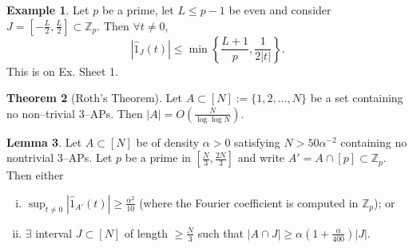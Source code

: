 \documentclass{article}
\theoremstyle{definition}
\newtheorem{theorem}{Theorem}[section]
\newtheorem{lemma}[theorem]{Lemma}
\newtheorem{example}[theorem]{Example}
\begin{document}
\begin{example}
    Let $p$ be a prime, let $L\le p-1$ be even and consider $J = \left[-\frac{L}{2},\frac{L}{2}\right] \subset \mathbb{Z}_p$. Then $\forall t \neq 0$, \[
    |\hat{1}_J(t)| \le \min \left\{\frac{L+1}{p}, \frac{1}{2|t|}\right\}.
    \]
    This is on Ex. Sheet 1. 
\end{example}
\begin{theorem}[Roth's Theorem]\label{theorem1.20}
    Let $A \subset [N] := \{1,2,\ldots,N\}$ be a set containing no non--trivial 3--APs. Then $|A| = O\left(\frac{N}{\log \log N}\right)$.
\end{theorem}
\begin{lemma}
    Let $A \subset [N]$ be of density $\alpha > 0$ satisfying $N > 50\alpha^{-2}$ containing no nontrivial 3--APs. Let $p$ be a prime in $\left[\frac{N}{3},\frac{2N}{3}\right]$ and write $A' = A \cap [p] \subset \mathbb{Z}_p$. Then either 
    \begin{enumerate}[(i)]
        \item $\sup_{t \neq 0} |\hat{1}_{A'}(t)| \ge \frac{\alpha^2}{10}$ (where the Fourier coefficient is computed in $\mathbb{Z}_p$); or
        \item $\exists$ interval $J \subset [N]$ of length $\ge \frac{N}{3}$ such that $|A \cap J| \ge \alpha\left(1+\frac{\alpha}{400}\right)|J|$.
    \end{enumerate}
\end{lemma}
\end{document}
